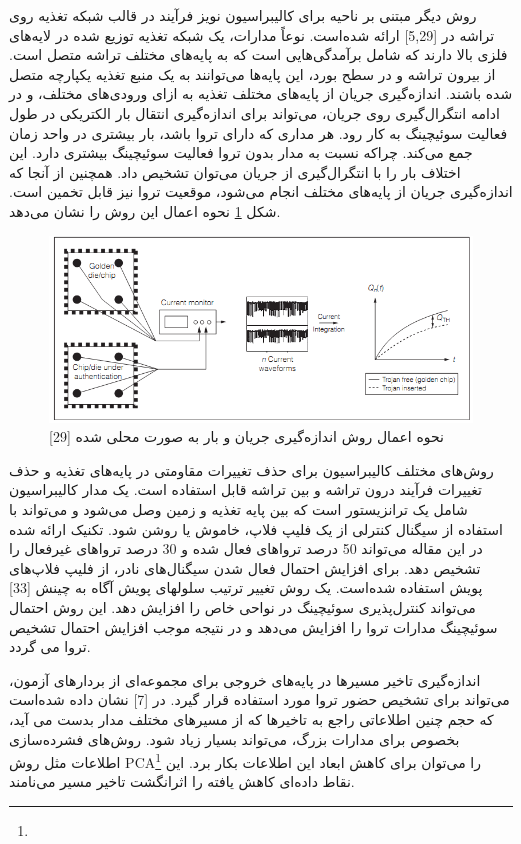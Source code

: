 روش دیگر مبتنی بر ناحیه برای کالیبراسیون نویز فرآیند در قالب شبکه تغذیه روی تراشه در [5,29] ارائه شده‌است. نوعاً مدارات، یک شبکه تغذیه توزیع شده در لایه‌های فلزی بالا دارند که شامل  برآمدگی‌هایی است که به پایه‌های مختلف تراشه متصل است. از بیرون تراشه و در سطح بورد، این پایه‌ها می‌توانند به یک منبع تغذیه یکپارچه متصل شده باشند. اندازه‌گیری جریان از پایه‌های مختلف تغذیه به ازای ورودی‌های مختلف، و در ادامه انتگرال‌گیری روی جریان، می‌تواند برای اندازه‌گیری انتقال بار الکتریکی در طول فعالیت سوئیچینگ به کار رود. هر مداری که دارای تروا باشد، بار بیشتری در واحد زمان جمع می‌کند. چراکه نسبت به مدار بدون تروا فعالیت سوئیچینگ بیشتری دارد. این اختلاف بار را با انتگرال‌گیری از جریان می‌توان تشخیص داد. همچنین از آنجا که اندازه‌گیری جریان از پایه‌های مختلف انجام می‌شود، موقعیت تروا نیز قابل تخمین است. شکل \ref{fig5-4} نحوه اعمال این روش را نشان می‌دهد.
  \begin{figure}
\begin{center}
\includegraphics[scale=0.8]{figs/fig5-4.png}
\caption{نحوه اعمال روش اندازه‌گیری جریان و بار به صورت محلی شده [29]}
\label{fig5-4}
\end{center}
\end{figure} 

روش‌های مختلف کالیبراسیون برای حذف تغییرات مقاومتی در پایه‌های تغذیه و حذف تغییرات فرآیند درون تراشه و بین تراشه قابل استفاده است. یک مدار کالیبراسیون شامل یک ترانزیستور است که بین پایه تغذیه و زمین وصل می‌شود و می‌تواند با استفاده از سیگنال کنترلی از یک فلیپ فلاپ، خاموش یا روشن شود. تکنیک ارائه شده در این مقاله می‌تواند 50 درصد تروا‌های فعال شده و 30 درصد تروا‌های غیرفعال را تشخیص دهد. برای افزایش احتمال فعال شدن سیگنال‌های نادر، از فلیپ فلاپ‌های پویش استفاده شده‌است.
یک روش تغییر ترتیب سلولهای پویش آگاه به چینش [33] می‌تواند کنترل‌پذیری سوئیچینگ در نواحی خاص را افزایش دهد. این روش احتمال سوئیچینگ مدارات تروا را افزایش می‌دهد و در نتیجه موجب افزایش احتمال تشخیص تروا می گردد.

اندازه‌گیری تاخیر مسیرها در پایه‌های خروجی برای مجموعه‌ای از بردارهای آزمون، می‌تواند برای تشخیص حضور تروا مورد استفاده قرار گیرد. در [7] نشان داده شده‌است که حجم چنین اطلاعاتی راجع به تاخیرها که از مسیرهای مختلف مدار بدست می آید، بخصوص برای مدارات بزرگ، می‌تواند بسیار زیاد شود. روش‌های فشرده‌سازی اطلاعات مثل روش PCA\footnote{} را می‌توان برای کاهش ابعاد این اطلاعات بکار برد. این نقاط داده‌ای کاهش یافته را اثرانگشت تاخیر مسیر می‌نامند.

